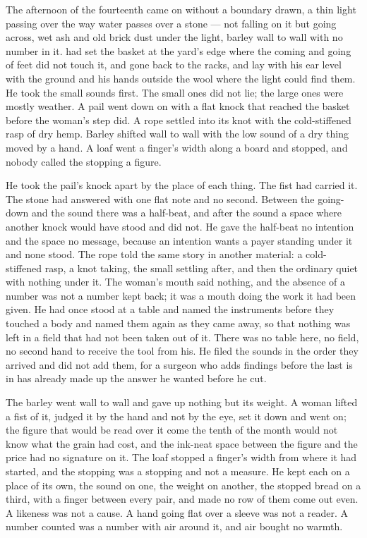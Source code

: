 The afternoon of the fourteenth came on without a boundary drawn, a thin light passing over  the way water passes over a stone --- not falling on it but going across, wet ash and old brick dust under the light, barley wall to wall with no number in it.  had set the basket at the yard's edge where the coming and going of feet did not touch it, and gone back to the racks, and  lay with his ear level with the ground and his hands outside the wool where the light could find them. He took the small sounds first. The small ones did not lie; the large ones were mostly weather. A pail went down on  with a flat knock that reached the basket before the woman's step did. A rope settled into its knot with the cold-stiffened rasp of dry hemp. Barley shifted wall to wall with the low sound of a dry thing moved by a hand. A loaf went a finger's width along a board and stopped, and nobody called the stopping a figure.

He took the pail's knock apart by the place of each thing. The fist had carried it. The stone had answered with one flat note and no second. Between the going-down and the sound there was a half-beat, and after the sound a space where another knock would have stood and did not. He gave the half-beat no intention and the space no message, because an intention wants a payer standing under it and none stood. The rope told the same story in another material: a cold-stiffened rasp, a knot taking, the small settling after, and then the ordinary quiet with nothing under it. The woman's mouth said nothing, and the absence of a number was not a number kept back; it was a mouth doing the work it had been given. He had once stood at a table and named the instruments before they touched a body and named them again as they came away, so that nothing was left in a field that had not been taken out of it. There was no table here, no field, no second hand to receive the tool from his. He filed the sounds in the order they arrived and did not add them, for a surgeon who adds findings before the last is in has already made up the answer he wanted before he cut.

The barley went wall to wall and gave up nothing but its weight. A woman lifted a fist of it, judged it by the hand and not by the eye, set it down and went on; the figure that would be read over it come the tenth of the month would not know what the grain had cost, and the ink-neat space between the figure and the price had no signature on it. The loaf stopped a finger's width from where it had started, and the stopping was a stopping and not a measure. He kept each on a place of its own, the sound on one, the weight on another, the stopped bread on a third, with a finger between every pair, and made no row of them come out even. A likeness was not a cause. A hand going flat over a sleeve was not a reader. A number counted was a number with air around it, and air bought no warmth.

